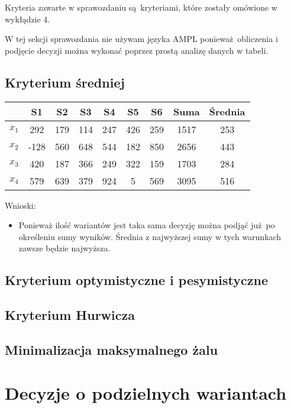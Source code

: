 \documentclass{article}
\begin{document}
Kryteria zawarte w sprawozdaniu są kryteriami, które zostały omówione w wykłądzie 4.

W tej sekcji sprawozdania nie używam języka AMPL ponieważ obliczenia i podjęcie decyzji można wykonać poprzez
prostą analizę danych w tabeli.

\subsection{Kryterium średniej}

\begin{table}[H]
  \begin{center}
    \begin{tabular}{ c |  c  c   c   c   c   c  | c | c  }
      & S1 & S2 & S3 & S4 & S5 & S6 & Suma & Średnia \\
      \hline
      $x_1$ & 292 & 179 & 114 & 247 & 426 & 259 & 1517 & 253 \\
      $x_2$ & -128 & 560 & 648 & 544 & 182 & 850 & 2656 & 443 \\
      $x_3$ & 420 & 187 & 366 & 249 & 322 & 159 & 1703 & 284 \\
      $x_4$ & 579 & 639 & 379 & 924 & 5 & 569 & \cellcolor{orange!25} 3095 & \cellcolor{orange!25} 516 \\
      \hline
    \end{tabular} 
  \end{center}
\end{table}

Wnioski:

\begin{itemize}
    \item Ponieważ ilość wariantów jest taka sama decyzję można podjąć już po określeniu sumy wyników. Średnia z najwyższej sumy
      w tych warunkach zawsze będzie najwyższa.
\end{itemize}


\subsection{Kryterium optymistyczne i pesymistyczne}

\subsection{Kryterium Hurwicza}

\subsection{Minimalizacja maksymalnego żalu}

\section{Decyzje o podzielnych wariantach}
\end{document}
